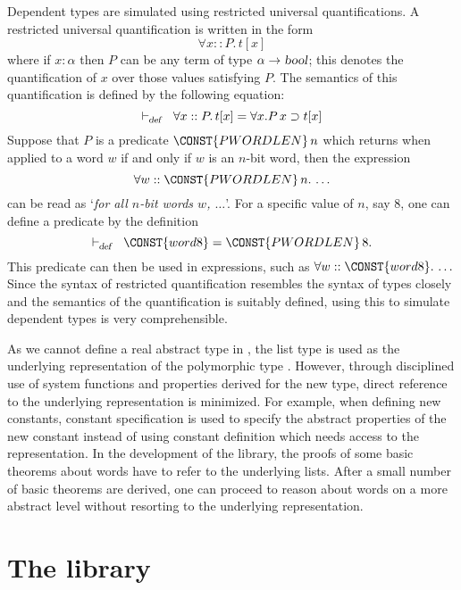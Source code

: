Dependent types are simulated using restricted universal
quantifications. A restricted universal quantification is written in the form
\[
\forall x ::P.\, t[x]
\]
where if $x:\alpha$ then $P$ can be any term of type $\alpha\rightarrow
\mbox{\sl bool}$; this
denotes the quantification of $x$ over those values satisfying $P$.
The semantics of this quantification is defined by the following
equation:
\begin{equation}
\DEF \forall x ::P.\, t[x] = \forall x. P\,x \IMP t[x]
\end{equation}
Suppose that $P$ is a predicate $\CONST{PWORDLEN}\,n$ which returns
 when applied to a word $w$ if and only if $w$ is an $n$-bit
word, then the expression
\[
\FORALL w \RESDOT \CONST{PWORDLEN}\,n\DOT \ldots
\]
can be read as `{\it for all $n$-bit words $w$, $\ldots$}'. For
a specific value of $n$, say 8, one can define a predicate
 by the definition
\[
\DEF \CONST{word8} = \CONST{PWORDLEN}\,8.
\]
This predicate can then be used in expressions, such as
$\FORALL w \RESDOT \CONST{word8}\DOT \ldots$
Since the syntax of restricted quantification resembles the syntax of
types closely and the semantics of the quantification is suitably
defined,  using this to simulate dependent types is very comprehensible.

As we cannot define a real abstract type in \HOL, the list type is used as the
underlying representation of the polymorphic type \word{*}. However,
through disciplined use of system functions and properties derived for
the new type, direct reference to the underlying
representation is minimized. For example, when defining new constants,
constant specification is used to specify the abstract properties of the
new constant instead of using constant definition which needs access
to the representation. In the development of the library, the proofs
of some basic theorems about words have to refer to the underlying
lists. After a small number of basic theorems are derived, one can
proceed to reason about words on a more abstract level without
resorting to the underlying representation. 

\section{The library}

